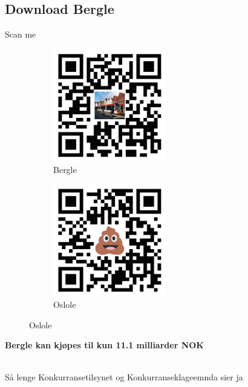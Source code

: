 \subsection*{Download Bergle}
\begin{frame}{Scan me}
    \begin{figure}
        \begin{subfigure}{0.45\textwidth}
            \centering
            \includegraphics[height=4.9cm]{images/bergleqr.png}
            \caption{Bergle}
            \label{fig:qrcodebergle}
        \end{subfigure}
        \hfill
        \begin{subfigure}{0.45\textwidth}
            \centering
            \includegraphics[height=4.9cm]{images/osloleqr.png}
            \caption{Oslole}
            \label{fig:qrcodeoslole}
        \end{subfigure}
    \end{figure}
\end{frame}


\begin{frame}
\begin{center}
\begin{Large}
\textbf{Bergle kan kjøpes til kun 11.1 milliarder NOK}
\end{Large}
\\[0.5cm]
Så lenge Konkurransetilsynet og Konkurranseklageemnda sier ja
\end{center}  
\end{frame}